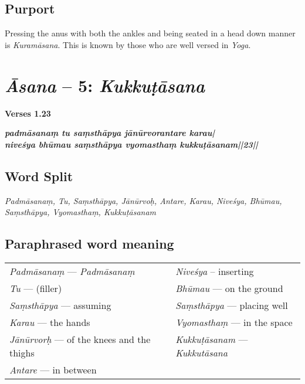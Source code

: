 \subsection*{Purport}

Pressing the anus with both the ankles and being seated in a head down manner is \textit{Kuramāsana}. This is known by those who are well versed in \textit{Yoga}. 

	
\section*{\textit{Āsana} -- 5: \textit{Kukkuṭāsana}}

\noindent 
\textbf{Verses 1.23}

\begin{shloka}
\textit{\textbf{padmāsanaṃ tu saṃsthāpya jānūrvorantare karau|}\\
\textbf{niveśya bhūmau saṃsthāpya vyomasthaṃ kukkuṭāsanam||23||}}
\end{shloka}

\subsection*{Word Split}

\textit{Padmāsanaṃ, Tu, Saṃsthāpya, Jānūrvoḥ, Antare, Karau, Niveśya, Bhūmau, Saṃsthāpya, Vyomasthaṃ, Kukkuṭāsanam}

\subsection*{Paraphrased word meaning}
\vspace{-10pt}

\begin{longtable}{>{\noindent\raggedright}p{5cm}>{\noindent\raggedright}p{5cm}}
\textit{Padmāsanaṃ} --- \textit{Padmāsanaṃ} & \textit{Niveśya} – inserting\tabularnewline
\textit{Tu}  --- (filler) & \textit{Bhūmau} --- on the ground\tabularnewline
\textit{Saṃsthāpya} --- assuming  & \textit{Saṃsthāpya} --- placing well\tabularnewline
\textit{Karau} --- the hands  & \textit{Vyomasthaṃ} --- in the space\tabularnewline
\textit{Jānūrvorḥ} --- of the knees and the thighs  & \textit{Kukkuṭāsanam} --- \textit{Kukkutāsana} \tabularnewline
\textit{Antare} --- in between & 
\end{longtable}


